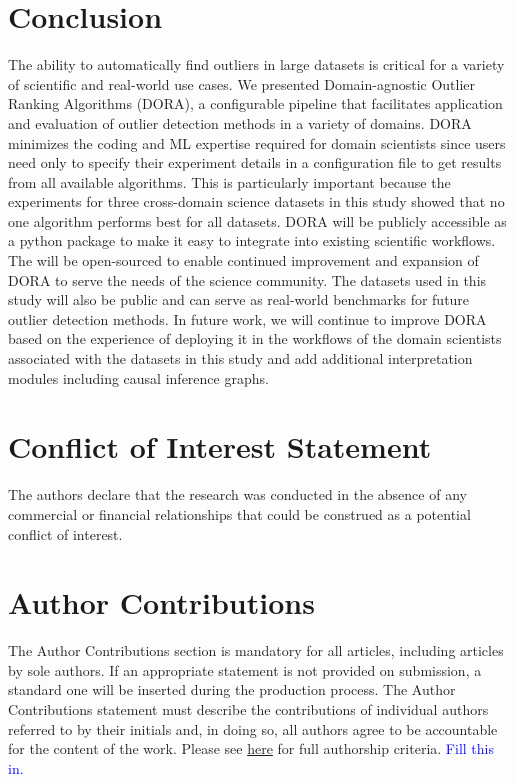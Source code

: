 \documentclass[utf8]{frontiersFPHY} %
\newcommand{\todo}[1]{\textcolor{blue}{#1}}
\begin{document}
\section{Conclusion}
The ability to automatically find outliers in large datasets is critical
for a variety of scientific and real-world use cases. 
We presented Domain-agnostic Outlier Ranking Algorithms (DORA),
a configurable pipeline that facilitates application and evaluation of
outlier detection methods in a variety of domains. DORA minimizes the
coding and ML expertise required for domain scientists since users
need only to specify their experiment details in a configuration file
to get results from all available algorithms. This is particularly important
because the experiments for three cross-domain science datasets in this
study showed that no one algorithm performs best for all datasets.
DORA will be publicly accessible as a python package to make it
easy to integrate into existing scientific workflows. 
The will be
open-sourced to enable continued improvement and expansion of DORA
to serve the needs of the science community. The datasets used in this
study will also be public and can serve as real-world benchmarks 
for future outlier detection methods. In future work, we will
continue to improve DORA based on the experience of deploying it in
the workflows of the domain scientists associated with the datasets in
this study and add additional interpretation modules 
including causal inference graphs.


\section*{Conflict of Interest Statement}

The authors declare that the research was conducted in the absence of any commercial or financial relationships that could be construed as a potential conflict of interest.

\section*{Author Contributions}

The Author Contributions section is mandatory for all articles, including articles by sole authors. If an appropriate statement is not provided on submission, a standard one will be inserted during the production process. The Author Contributions statement must describe the contributions of individual authors referred to by their initials and, in doing so, all authors agree to be accountable for the content of the work. Please see  \href{http://home.frontiersin.org/about/author-guidelines#AuthorandContributors}{here} for full authorship criteria. \todo{Fill this in.}
\end{document}
